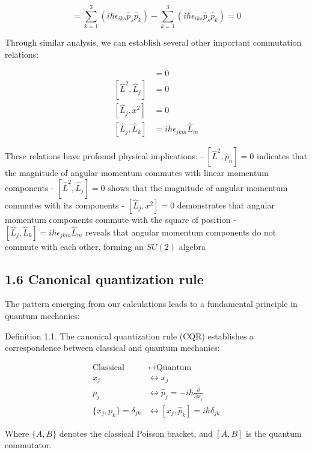 \documentclass[10pt]{article}
\begin{document}
\begin{equation*}
[\hat{L}_i, \hat{p}^2] = \sum_{k=1}^{3}(i\hbar\epsilon_{iks}\hat{p}_s\hat{p}_k) - \sum_{k=1}^{3}(i\hbar\epsilon_{iks}\hat{p}_s\hat{p}_k) = 0 \tag{1.73}
\end{equation*}

Through similar analysis, we can establish several other important commutation relations:

\begin{align*}
[\hat{L}^2, \hat{p}_n] &= 0 \\
[\hat{L}^2, \hat{L}_j] &= 0 \\
[\hat{L}_j, x^2] &= 0 \tag{1.74} \\
[\hat{L}_j, \hat{L}_k] &= i\hbar\epsilon_{jkm}\hat{L}_m
\end{align*}

These relations have profound physical implications:
- $[\hat{L}^2, \hat{p}_n] = 0$ indicates that the magnitude of angular momentum commutes with linear momentum components
- $[\hat{L}^2, \hat{L}_j] = 0$ shows that the magnitude of angular momentum commutes with its components
- $[\hat{L}_j, x^2] = 0$ demonstrates that angular momentum components commute with the square of position
- $[\hat{L}_j, \hat{L}_k] = i\hbar\epsilon_{jkm}\hat{L}_m$ reveals that angular momentum components do not commute with each other, forming an $SU(2)$ algebra

\subsection*{1.6 Canonical quantization rule}

The pattern emerging from our calculations leads to a fundamental principle in quantum mechanics:

Definition 1.1. The canonical quantization rule (CQR) establishes a correspondence between classical and quantum mechanics:

\begin{align*}
\text{Classical} &\longleftrightarrow \text{Quantum} \\
x_j &\longleftrightarrow x_j \\
p_j &\longleftrightarrow \hat{p}_j = -i\hbar\frac{\partial}{\partial x_j} \tag{1.75} \\
\{x_j, p_k\} = \delta_{jk} &\longleftrightarrow [x_j, \hat{p}_k] = i\hbar\delta_{jk}
\end{align*}

Where $\{A,B\}$ denotes the classical Poisson bracket, and $[A,B]$ is the quantum commutator.
\end{document}
